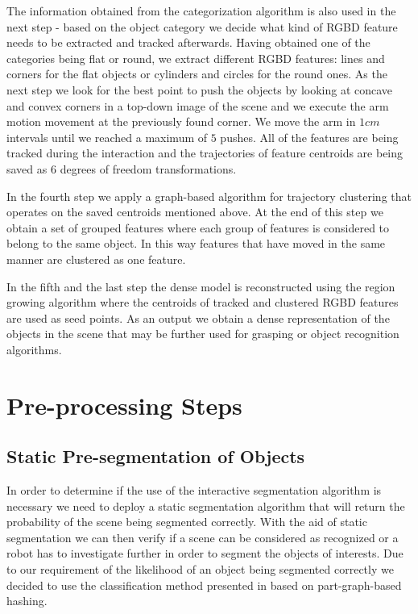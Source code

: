  The information obtained from the categorization algorithm is also used in the next step - based on the object category we decide what kind of RGBD feature needs to be extracted and tracked afterwards. Having obtained one of the categories being flat or round, we extract different RGBD features: lines and corners for the flat objects or cylinders and circles for the round ones. As the next step we look for the best point to push the objects by looking at concave and convex corners in a top-down image of the scene and we execute the arm motion movement at the previously found corner. We move the arm in $1cm$ intervals until we reached a maximum of $5$ 
  pushes. All of the features are being tracked during the interaction 
 and the trajectories of feature centroids  are being  saved as 6 degrees of freedom transformations. 
 
  
In the fourth step we apply a graph-based algorithm for trajectory clustering that operates on the saved centroids mentioned above. At the end of this step we obtain a set of grouped features where each group of features is considered to belong to the same object. In this way features that have moved in the same manner are clustered as one feature. 

 In the fifth and the last step the dense model is reconstructed using the region growing algorithm 
where the centroids of tracked and clustered RGBD features are
used as seed points. As an output we obtain a dense representation of the objects in the scene that may be further used for grasping or object recognition algorithms.

\section{Pre-processing Steps}


\subsection{Static Pre-segmentation of Objects}
\label{sec:static-seg}

In order to determine if the use of the interactive segmentation algorithm is necessary we need to deploy a static segmentation algorithm that will return the probability of the scene being segmented correctly. With the aid of static segmentation we can then verify if a scene can be considered as recognized or a robot has to investigate further in order to segment the objects of interests. Due to our requirement of the likelihood of an object being segmented correctly we decided to use the classification method presented in \cite{marton12SC} based on part-graph-based hashing.

